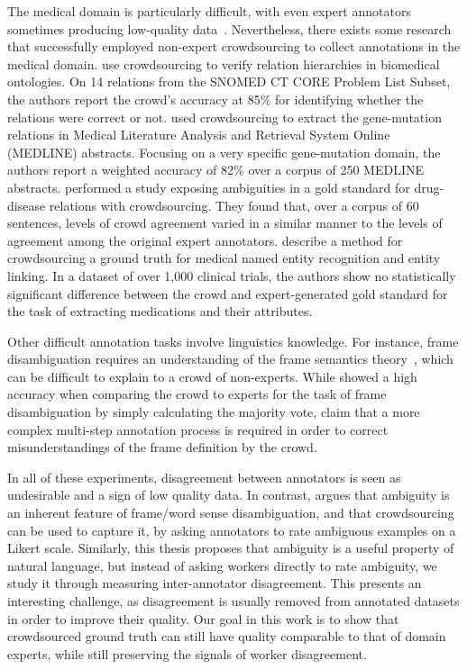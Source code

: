 The medical domain is particularly difficult, with even expert annotators sometimes producing low-quality data~\cite{Marcheggiani:2017:ELT:3139489.3106235}. Nevertheless, there exists some research that successfully employed non-expert crowdsourcing to collect annotations in the medical domain. \citet{mortensen2013crowdsourcing} use crowdsourcing to verify relation hierarchies in biomedical ontologies. On 14 relations from the SNOMED CT CORE Problem List Subset, the authors report the crowd's accuracy at 85\% for identifying whether the relations were correct or not. \citet{burger2012validating} used crowdsourcing to extract the gene-mutation relations in Medical Literature Analysis and Retrieval System Online (MEDLINE) abstracts. Focusing on a very specific gene-mutation domain, the authors report a weighted accuracy of 82\% over a corpus of 250 MEDLINE abstracts. \citet{li2015exposing} performed a study exposing ambiguities in a gold standard for drug-disease relations with crowdsourcing. They found that, over a corpus of 60 sentences, levels  of  crowd agreement varied in a similar manner to the levels of agreement  among  the  original  expert  annotators. \citet{zhai2013web} describe a method for crowdsourcing a ground truth for medical named entity recognition and entity linking. In a dataset of over 1,000 clinical trials, the authors show no statistically significant difference between the crowd and expert-generated gold standard for the task of extracting medications and their attributes.

Other difficult annotation tasks involve linguistics knowledge. For instance, frame disambiguation requires an understanding of the frame semantics theory~\cite{baker1998berkeley}, which can be difficult to explain to a crowd of non-experts. While \citet{Hong:2011:GCR:2018966.2018970} showed a high accuracy when comparing the crowd to experts for the task of frame disambiguation by simply calculating the majority vote, \citet{chang2015scaling} claim that a more complex multi-step annotation process is required in order to correct misunderstandings of the frame definition by the crowd.

In all of these experiments, disagreement between annotators is seen as undesirable and a sign of low quality data. In contrast, \citet{jurgens2013embracing} argues that ambiguity is an inherent feature of frame/word sense disambiguation, and that crowdsourcing can be used to capture it, by asking annotators to rate ambiguous examples on a Likert scale. Similarly, this thesis proposes that ambiguity is a useful property of natural language, but instead of asking workers directly to rate ambiguity, we study it through measuring inter-annotator disagreement. This presents an interesting challenge, as disagreement is usually removed from annotated datasets in order to improve their quality. Our goal in this work is to show that crowdsourced ground truth can still have quality comparable to that of domain experts, while still preserving the signals of worker disagreement.


